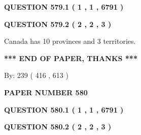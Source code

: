 \documentclass[12pt]{article}
\begin{document}
{\textbf{\Large{QUESTION
579.1 
 ( 1 , 1 , 6791 )
}}}
  
  
  
\vspace{0.2in}
  
{\textbf{\Large{QUESTION
579.2 
 ( 2 , 2 , 3 )
}}}
  
  
 
 
\noindent{}
 
 
Canada has 10  provinces and 3 territories.
 
 
 
 
   
   
 \vspace{0.2in}
 
   
   
   
   
\vspace{1.0in} 
{\textbf{\large{ *** END OF PAPER, THANKS *** }}} 
   
   
\hspace{1.0in} By: 
 239 ( 416 ,  613 )
   
   
   
   
\newpage 
\setcounter{page}{ 
   580001 } 
   
   
   
   
 {\textbf{ \Large{ PAPER NUMBER  580  }}}
   
   
\vspace{0.2in}
   
   
   
   
   
   
 \vspace{0.2in}
 
 
 
 
   
   
  
\vspace{0.2in}
  
{\textbf{\Large{QUESTION
580.1 
 ( 1 , 1 , 6791 )
}}}
  
  
  
\vspace{0.2in}
  
{\textbf{\Large{QUESTION
580.2 
 ( 2 , 2 , 3 )
}}}
  
  
 
 
\noindent{}
 
\end{document}
